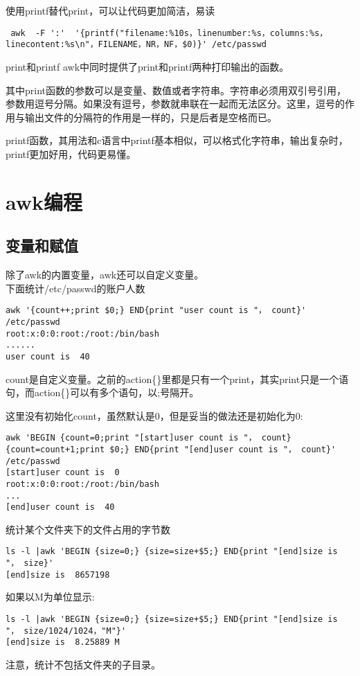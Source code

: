 \documentclass[12pt]{article}
\begin{document}
使用printf替代print，可以让代码更加简洁，易读
\begin{lstlisting} 
 awk  -F ':'  '{printf("filename:%10s，linenumber:%s，columns:%s，linecontent:%s\n"，FILENAME，NR，NF，$0)}' /etc/passwd
\end{lstlisting} 

print和printf
awk中同时提供了print和printf两种打印输出的函数。

其中print函数的参数可以是变量、数值或者字符串。字符串必须用双引号引用，参数用逗号分隔。如果没有逗号，参数就串联在一起而无法区分。这里，逗号的作用与输出文件的分隔符的作用是一样的，只是后者是空格而已。

printf函数，其用法和c语言中printf基本相似，可以格式化字符串，输出复杂时，printf更加好用，代码更易懂。

 

\section{awk编程}
\subsection{变量和赋值}
除了awk的内置变量，awk还可以自定义变量。\\
下面统计/etc/passwd的账户人数
\begin{lstlisting} 
awk '{count++;print $0;} END{print "user count is "， count}' /etc/passwd
root:x:0:0:root:/root:/bin/bash
......
user count is  40
\end{lstlisting} 
count是自定义变量。之前的action\{\}里都是只有一个print，其实print只是一个语句，而action\{\}可以有多个语句，以;号隔开。


这里没有初始化count，虽然默认是0，但是妥当的做法还是初始化为0:
\begin{lstlisting} 
awk 'BEGIN {count=0;print "[start]user count is "， count} {count=count+1;print $0;} END{print "[end]user count is "， count}' /etc/passwd
[start]user count is  0
root:x:0:0:root:/root:/bin/bash
...
[end]user count is  40
\end{lstlisting} 

统计某个文件夹下的文件占用的字节数
\begin{lstlisting} 
ls -l |awk 'BEGIN {size=0;} {size=size+$5;} END{print "[end]size is "， size}'
[end]size is  8657198
\end{lstlisting} 

如果以M为单位显示:
\begin{lstlisting} 
ls -l |awk 'BEGIN {size=0;} {size=size+$5;} END{print "[end]size is "， size/1024/1024，"M"}' 
[end]size is  8.25889 M
\end{lstlisting} 
注意，统计不包括文件夹的子目录。
\end{document}
